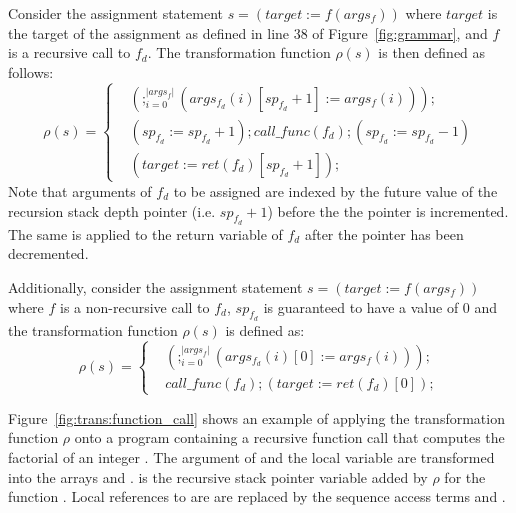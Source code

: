Consider the assignment statement $s = (target := f(args_f))$ where $target$ is the 
target of the assignment as defined in line 38 of Figure~\ref{fig:grammar}, and 
$f$ is a recursive call to $f_d$.
The transformation function $\rho(s)$ is then defined as follows:
\begin{equation}
\rho(s) = 
\begin{cases}
  & \left(  ;_{i = 0}^{|args_f|} \left( args_{f_d}(i)[sp_{f_d}+1] := args_f(i) \right) \right) ; \\
 & \left( sp_{f_d} := sp_{f_d} + 1 \right) ; call\_func(f_d) ; \left( sp_{f_d} := sp_{f_d} - 1 \right) \\
 & \left( target := ret(f_d)[sp_{f_d}+1] \right) ; 
\end{cases}
\end{equation}
Note that arguments of $f_d$ to be assigned are indexed by the future 
value of the recursion stack depth pointer (i.e. $sp_{f_d}+1$) before the
the pointer is incremented. The same is applied to the return variable 
of $f_d$ after the pointer has been decremented. 

Additionally, consider the assignment statement $s = (target := f(args_f))$ where
$f$ is a non-recursive call to $f_d$, $sp_{f_d}$ is guaranteed to have a value 
of $0$ and the transformation function $\rho(s)$ is defined as:
\begin{equation}
\rho(s) = 
\begin{cases}
  & \left(  ;_{i = 0}^{|args_f|} \left( args_{f_d}(i)[0] := args_f(i) \right) \right) ; \\
 &call\_func(f_d) ; \left( target := ret(f_d)[0] \right) ; 
\end{cases}
\end{equation}

Figure~\ref{fig:trans:function_call}
shows an example of applying the transformation function $\rho$ onto a program containing
a recursive function call  that computes the factorial 
of an integer .
The argument  of  and the local variable  are transformed into the
arrays  and .  is the recursive stack pointer
variable added by $\rho$ for the function .
Local references to  are  are replaced 
by the sequence access terms  and .

